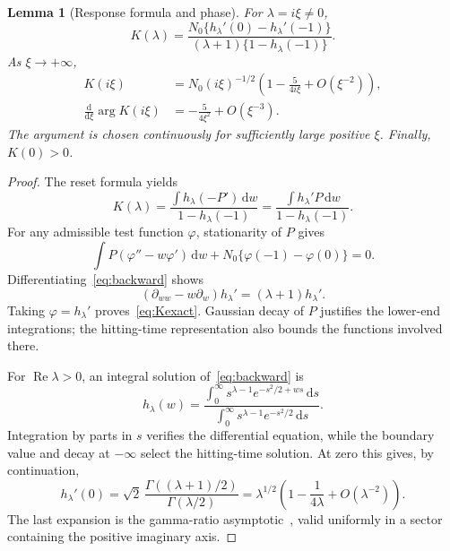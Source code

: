 \documentclass[11pt,a4paper]{article}
\numberwithin{equation}{section}
\newtheorem{lemma}[theorem]{Lemma}
\theoremstyle{remark}\newtheorem{remark}[theorem]{Remark}
\newcommand{\dd}{\,\mathrm d}
\DeclareMathOperator{\Rea}{Re}
\begin{document}
\begin{lemma}[Response formula and phase]\label{lem:response}
For $\lambda=i\xi\ne0$,
\begin{equation}\label{eq:Kexact}
 K(\lambda)=
 \frac{N_0\{h_\lambda'(0)-h_\lambda'(-1)\}}
 {(\lambda+1)\{1-h_\lambda(-1)\}}.
\end{equation}
As $\xi\to+\infty$,
\begin{align}
 K(i\xi)&=N_0(i\xi)^{-1/2}
 \left(1-\frac{5}{4i\xi}+O(\xi^{-2})\right),\label{eq:Kasympt}\\
 \frac{\mathrm d}{\mathrm d\xi}\arg K(i\xi)
 &=-\frac{5}{4\xi^2}+O(\xi^{-3}).\label{eq:phase-derivative}
\end{align}
The argument is chosen continuously for sufficiently large positive $\xi$. Finally, $K(0)>0$.
\end{lemma}
\begin{proof}
The reset formula yields
\[
 K(\lambda)=\frac{\int h_\lambda(-P')\dd w}{1-h_\lambda(-1)}
 =\frac{\int h_\lambda'P\dd w}{1-h_\lambda(-1)}.
\]
For any admissible test function $\varphi$, stationarity of $P$ gives
\[
 \int P(\varphi''-w\varphi')\dd w
 +N_0\{\varphi(-1)-\varphi(0)\}=0.
\]
Differentiating~\eqref{eq:backward} shows
\[
 (\partial_{ww}-w\partial_w)h_\lambda'=(\lambda+1)h_\lambda'.
\]
Taking $\varphi=h_\lambda'$ proves~\eqref{eq:Kexact}. Gaussian decay of $P$ justifies the lower-end integrations; the hitting-time representation also bounds the functions involved there.

For $\Rea\lambda>0$, an integral solution of~\eqref{eq:backward} is
\[
 h_\lambda(w)=
 \frac{\int_0^\infty s^{\lambda-1}e^{-s^2/2+ws}\dd s}
      {\int_0^\infty s^{\lambda-1}e^{-s^2/2}\dd s}.
\]
Integration by parts in $s$ verifies the differential equation, while the boundary value and decay at $-\infty$ select the hitting-time solution. At zero this gives, by continuation,
\begin{equation}\label{eq:gamma-ratio}
 h_\lambda'(0)=\sqrt2\,
 \frac{\Gamma((\lambda+1)/2)}{\Gamma(\lambda/2)}
 =\lambda^{1/2}\left(1-\frac1{4\lambda}+O(\lambda^{-2})\right).
\end{equation}
The last expansion is the gamma-ratio asymptotic~\cite{dlmf}, valid uniformly in a sector containing the positive imaginary axis.


\end{proof}
\end{document}
